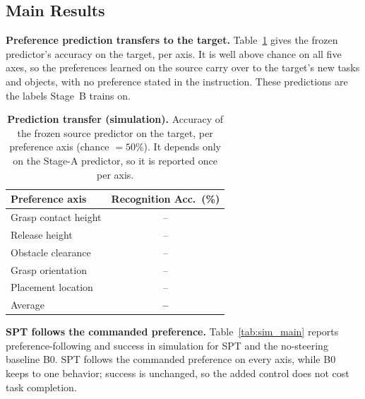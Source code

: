 \documentclass{article}
\begin{document}
\subsection{Main Results}
\label{sec:exp-main}

\textbf{Preference prediction transfers to the target.}
Table~\ref{tab:sim_recognition} gives the frozen predictor's accuracy on the
target, per axis. It is well above chance on all five axes, so the preferences
learned on the source carry over to the target's new tasks and objects, with no
preference stated in the instruction. These predictions are the labels Stage~B
trains on.

\begin{table}[t]
  \centering
  \small
  \caption{\textbf{Prediction transfer (simulation).} Accuracy of the frozen
  source predictor on the target, per preference axis (chance $=50\%$). It
  depends only on the Stage-A predictor, so it is reported once per axis.}
  \label{tab:sim_recognition}
  \begin{tabular}{lc}
    \hline
    Preference axis & Recognition Acc.\ (\%) \\
    \hline
    Grasp contact height & -- \\
    Release height       & -- \\
    Obstacle clearance   & -- \\
    Grasp orientation    & -- \\
    Placement location   & -- \\
    \hline
    Average              & \textbf{--} \\
    \hline
  \end{tabular}
\end{table}

\textbf{SPT follows the commanded preference.}
Table~\ref{tab:sim_main} reports preference-following and success in simulation
for SPT and the no-steering baseline B0. SPT follows the commanded preference on
every axis, while B0 keeps to one behavior; success is unchanged, so the added
control does not cost task completion. 
\end{document}
